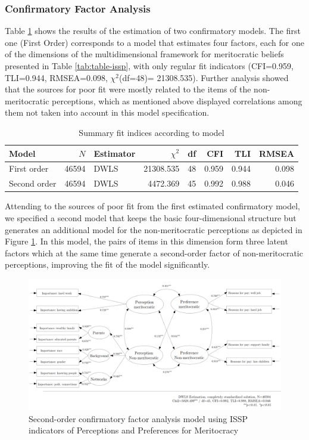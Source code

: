 \documentclass[
  10pt,
  a4paper,
]{article}
\begin{document}
\subsubsection{Confirmatory Factor Analysis}\label{confirmatory-factor-analysis}

Table \ref{tab:sum-fit-issp} shows the results of the estimation of two confirmatory models. The first one (First Order) corresponds to a model that estimates four factors, each for one of the dimensions of the multidimensional framework for meritocratic beliefs presented in Table \ref{tab:table-issp}, with only regular fit indicators (CFI=0.959, TLI=0.944, RMSEA=0.098, \(\chi^2\)(df=48)= 21308.535). Further analysis showed that the sources for poor fit were mostly related to the items of the non-meritocratic perceptions, which as mentioned above displayed correlations among them not taken into account in this model specification.

\begin{table}[H]

\caption{\label{tab:sum-fit-issp}Summary fit indices according to model}
\centering
\fontsize{10}{12}\selectfont
\begin{tabular}[t]{lrlrrrrr}
\toprule
Model & $N$ & Estimator & $\chi^2$ & df & CFI & TLI & RMSEA\\
\midrule
First order & 46594 & DWLS & 21308.535 & 48 & 0.959 & 0.944 & 0.098\\
Second order & 46594 & DWLS & 4472.369 & 45 & 0.992 & 0.988 & 0.046\\
\bottomrule
\end{tabular}
\end{table}

Attending to the sources of poor fit from the first estimated confirmatory model, we specified a second model that keeps the basic four-dimensional structure but generates an additional model for the non-meritocratic perceptions as depicted in Figure \ref{fig:meas02-issp}. In this model, the pairs of items in this dimension form three latent factors which at the same time generate a second-order factor of non-meritocratic perceptions, improving the fit of the model significantly.

\begin{figure}[H]

{\centering \includegraphics[width=0.85\linewidth]{output/images/figure4} 

}

\caption{Second-order confirmatory factor analysis model using ISSP indicators of Perceptions and Preferences for Meritocracy}\label{fig:meas02-issp}
\end{figure}
\end{document}
